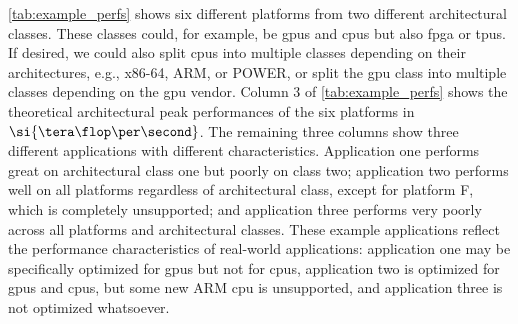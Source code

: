 \begin{table}[]
\begin{tblr}
        \bottomrule
    \end{tblr}
    \caption{%
    Architectural performance results for three example applications and six hardware platforms. 
    Platforms A, B, and C belong to one architectural class, and platforms D, E, and F belong to another class. 
    Application 1 had a very good performance in architectural class 1 but a very bad performance in class 2. 
    Application 2 performs well across all platforms except for platform F, which is unsupported. 
    Application 3 performs badly on all platforms. 
    }
    \label{tab:example_perfs}
\end{table}

\autoref{tab:example_perfs} shows six different platforms from two different architectural classes. 
These classes could, for example, be \glspl{gpu} and \glspl{cpu} but also \gls{fpga} or \glspl{tpu}. 
If desired, we could also split \glspl{cpu} into multiple classes depending on their architectures, e.g., x86-64, ARM, or POWER, or split the \gls{gpu} class into multiple classes depending on the \gls{gpu} vendor. 
Column 3 of \autoref{tab:example_perfs} shows the theoretical architectural peak performances of the six platforms in $\si{\tera\flop\per\second}$. 
The remaining three columns show three different applications with different characteristics. 
Application one performs great on architectural class one but poorly on class two; application two performs well on all platforms regardless of architectural class, except for platform F, which is completely unsupported; and application three performs very poorly across all platforms and architectural classes. 
These example applications reflect the performance characteristics of real-world applications: application one may be specifically optimized for \glspl{gpu} but not for \glspl{cpu}, application two is optimized for \glspl{gpu} and \glspl{cpu}, but some new ARM \gls{cpu} is unsupported, and application three is not optimized whatsoever. 

